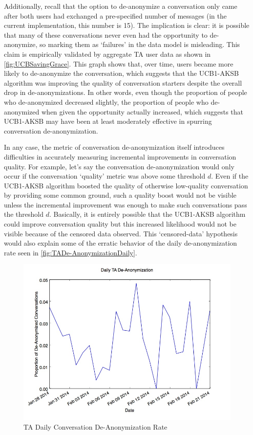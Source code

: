 Additionally, recall that the option to de-anonymize a conversation only came after both users had exchanged a pre-specified number of messages (in the current implementation, this number is 15). The implication is clear: it is possible that many of these conversations never even had the opportunity to de-anonymize, so marking them as `failures' in the data model is misleading. This claim is empirically validated by aggregate TA user data as shown in \autoref{fig:UCBSavingGrace}. This graph shows that, over time, users became more likely to de-anonymize the conversation, which suggests that the UCB1-AKSB algorithm was improving the quality of conversation starters despite the overall drop in de-anonymizations. In other words, even though the proportion of people who de-anonymized decreased slightly, the proportion of people who de-anonymized when given the opportunity actually increased, which suggests that UCB1-AKSB may have been at least moderately effective in spurring conversation de-anonymization.

In any case, the metric of conversation de-anonymization itself introduces difficulties in accurately measuring incremental improvements in conversation quality. For example, let's say the conversation de-anonymization would only occur if the conversation `quality' metric was above some threshold $d$. Even if the UCB1-AKSB algorithm boosted the quality of otherwise low-quality conversation by providing some common ground, such a quality boost would not be visible unless the incremental improvement was enough to make such conversations pass the threshold $d$. Basically, it is entirely possible that the UCB1-AKSB algorithm could improve conversation quality but this increased likelihood would not be visible because of the censored data observed. This `censored-data' hypothesis would also explain some of the erratic behavior of the daily de-anonymization rate seen in \autoref{fig:TADe-AnonymizationDaily}.

\begin{figure}[H]
\centering
\includegraphics[trim= 0mm 0mm 0mm 0mm, clip, scale=0.5]{./Figures/DailyTADe-Anonymization.jpg}
\caption{TA Daily Conversation De-Anonymization Rate}
\label{fig:TADe-AnonymizationDaily}
\end{figure}

